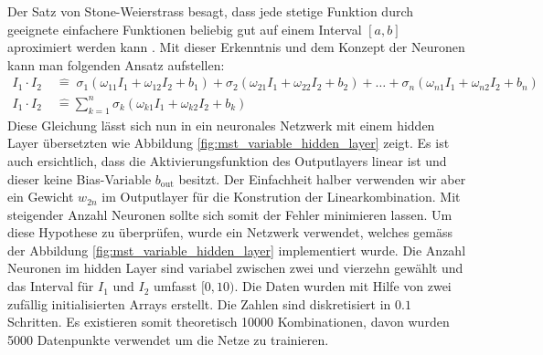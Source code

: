 Der Satz von Stone-Weierstrass besagt, dass jede stetige Funktion
durch geeignete einfachere Funktionen beliebig gut auf einem Interval
$[a, b]$ aproximiert werden kann \cite{wiki:StoneWeierstrass}. Mit
dieser Erkenntnis und dem Konzept der Neuronen kann man folgenden
Ansatz aufstellen:
\begin{align}
I_{1} \cdot I_{2} \; & \hat{=} \; \sigma_{1} \left( \omega_{11} I_1 + \omega_{12} I_2 + b_{1} \right) + \sigma_{2} \left( \omega_{21} I_1 + \omega_{22} I_2 + b_{2}  \right) + \dots  + \sigma_{n} \left( \omega_{n1} I_1 + \omega_{n2} I_2 + b_{n} \right) \\
I_{1} \cdot I_{2} \; & \hat{=} \sum_{k=1}^{n} \sigma_{k} \left( \omega_{k1} I_1 + \omega_{k2} I_2 + b_{k} \right)
\label{eq:mst_traivial_sum}
\end{align}
Diese Gleichung lässt sich nun in ein neuronales Netzwerk mit einem
hidden Layer übersetzten wie Abbildung \ref{fig:mst_variable_hidden_layer}
zeigt. Es ist auch ersichtlich, dass die Aktivierungsfunktion des
Outputlayers linear ist und dieser keine Bias-Variable $b_{\text{out}}$
besitzt. Der Einfachheit halber verwenden wir aber ein Gewicht
$w_{2n}$ im Outputlayer für die Konstrution der Linearkombination.
%
Mit steigender Anzahl Neuronen sollte sich somit der Fehler minimieren
lassen. Um diese Hypothese zu überprüfen, wurde ein Netzwerk
verwendet, welches gemäss der Abbildung \ref{fig:mst_variable_hidden_layer}
implementiert wurde. Die Anzahl Neuronen im hidden Layer sind
variabel zwischen zwei und vierzehn gewählt und das Interval für
$I_1$ und $I_2$ umfasst $[0, 10)$. Die Daten wurden mit Hilfe von
zwei zufällig initialisierten Arrays erstellt. Die Zahlen sind
diskretisiert in $0.1$ Schritten. Es existieren somit theoretisch
10000 Kombinationen, davon wurden 5000 Datenpunkte verwendet um die
Netze zu trainieren.


